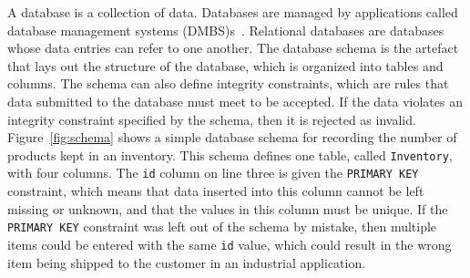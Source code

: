 A database is a collection of data. Databases
are managed by applications called database management systems (DMBS)s~\cite{databasebook}.
Relational databases are databases whose data entries can refer to one another. The database schema
is the artefact that lays out the structure of the database, which is organized into tables and columns.
The schema can also define integrity constraints, which are rules that data submitted to the database must
meet to be accepted. If the data violates an integrity constraint specified by the schema, then it is rejected as
invalid. Figure~\ref{fig:schema} shows a simple database schema for recording the number of products
kept in an inventory. This schema defines one table, called \texttt{Inventory}, with four columns.
The \texttt{id} column on line three is given the \texttt{PRIMARY KEY} constraint, which means that
data inserted into this column cannot be left missing or unknown, and that the values in this column
must be unique. If the \texttt{PRIMARY KEY} constraint was left out of the schema by mistake, then multiple
items could be entered with the same \texttt{id} value, which could result in the wrong item being shipped
to the customer in an industrial application.
